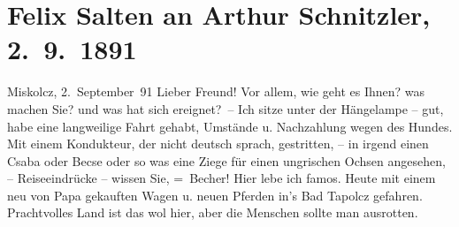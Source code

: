 

         
         \renewcommand{\erwaehntePersonen}{Personen: Bertha Karlsburg, Paula Makay, Felix Salten, Philipp Salzmann, Michael Emil Salzmann, Ignaz Salzmann, Theodor Salzmann, Geza Sós}
         \renewcommand{\erwaehnteInstitutionen}{Institutionen: Danzer’s Orpheum}
         \renewcommand{\erwaehnteOrte}{Orte: Miskolc, Miskolctapolca, Mödling, Ungarn, Wien}
         \renewcommand{\erwaehnteWerke}{}
               \section[Felix Salten an Arthur Schnitzler, 2. 9. 1891]{ Felix Salten an Arthur Schnitzler, 2. 9. 1891}\nopagebreak{}\rehead{ }\begin{ledgroupsized}[t]{13cm}\normalsize\beginnumbering{} \toendnotes[C]{\smallbreak\pagebreak[2]} 
\toendnotes[C]{\smallbreak}\pstart
           \raggedleft{}{\pb}Miskolcz, 2. September 91\pend
           \pstart
           Lieber Freund! Vor allem, wie geht es Ihnen? was
               machen Sie? und was hat sich ereignet? –\pend
           \pstart
           Ich sitze unter der Hängelampe – gut, habe eine langweilige Fahrt gehabt, Umstände u.
               Nachzahlung wegen des Hundes. Mit einem Kondukteur, der nicht deutsch sprach,
               gestritten, – in irgend einen Csaba oder Becse oder so was eine Ziege für einen
               ungrischen Ochsen angesehen, – Reiseeindrücke – wissen Sie, = Becher!\pend
           \pstart
           {\pb}Hier lebe ich famos. Heute mit einem neu von Papa gekauften Wagen u. neuen Pferden in’s
                  Bad Tapolcz gefahren. Prachtvolles Land ist das wol hier, aber
               die Menschen sollte man ausrotten.\pend
           \pstart

\end{ledgroupsized}
